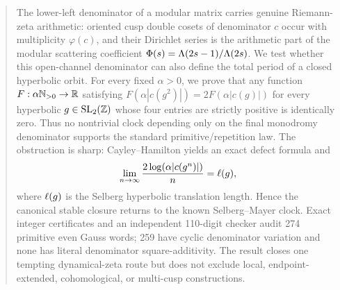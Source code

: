 \begin{abstract}
The lower-left denominator of a modular matrix carries genuine Riemann-zeta
arithmetic: oriented cusp double cosets of denominator $c$ occur with
multiplicity $\varphi(c)$, and their Dirichlet series is the arithmetic part of
the modular scattering coefficient
$\PhiSc(s)=\Lambda(2s-1)/\Lambda(2s)$.  We test whether this open-channel
denominator can also define the total period of a closed hyperbolic orbit.
For every fixed $\alpha>0$, we prove that any function
$F:\alpha\N_{>0}\to\R$ satisfying
$F(\alpha|c(g^2)|)=2F(\alpha|c(g)|)$ for every hyperbolic
$g\in\GammaSL$ whose four entries are strictly positive is identically zero.
Thus no nontrivial clock depending only
on the final monodromy denominator supports the standard primitive/repetition
law.  The obstruction is sharp: Cayley--Hamilton yields an exact defect
formula and
\[
  \lim_{n\to\infty}\frac{2\log(\alpha|c(g^n)|)}{n}=\Length(g),
\]
where $\Length(g)$ is the Selberg hyperbolic translation length.  Hence the
canonical stable closure returns to the known Selberg--Mayer clock.  Exact
integer certificates and an independent 110-digit checker audit 274 primitive
even Gauss words; 259 have cyclic denominator variation and none has literal
denominator square-additivity.  The result closes one tempting dynamical-zeta
route but does not exclude local, endpoint-extended, cohomological, or
multi-cusp constructions.
\end{abstract}
